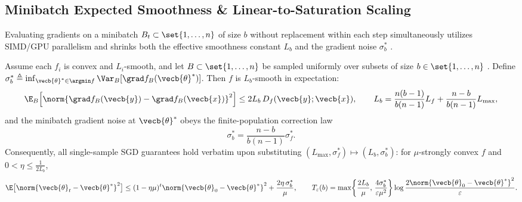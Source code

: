 \documentclass[../../../../master.tex]{subfiles}
\begin{document}
\subsection{Minibatch Expected Smoothness \& Linear-to-Saturation Scaling}
\label{sec:sgd:minibatch}

Evaluating gradients on a minibatch $B_t \subset \set{1,\dots,n}$ of size $b$ without replacement within each step simultaneously utilizes SIMD/GPU parallelism and shrinks both the effective smoothness constant $L_b$ and the gradient noise $\sigma_b^*$  .

\begin{coremath}
Assume each $f_i$ is convex and $L_i$-smooth, and let $B \subset \set{1,\dots,n}$ be sampled uniformly over subsets of size $b \in \set{1,\dots,n}$ . Define $\sigma_b^* \triangleq \inf_{\vecb{\theta}^*\in\argmin f} \Var_B[\grad f_B(\vecb{\theta}^*)]$. Then $f$ is $L_b$-smooth in expectation:
\begin{equation}
\label{eq:sgd:minibatch-Lb}
\E_B\Bigl[\norm{\grad f_B(\vecb{y}) - \grad f_B(\vecb{x})}^2\Bigr] \le 2L_b\, D_f(\vecb{y}; \vecb{x}),
\qquad
L_b = \frac{n(b-1)}{b(n-1)} L_f + \frac{n-b}{b(n-1)} L_{\max},
\end{equation}
and the minibatch gradient noise at $\vecb{\theta}^*$ obeys the finite-population correction law
\begin{equation}
\label{eq:sgd:minibatch-noise}
\sigma_b^* = \frac{n-b}{b(n-1)}\sigma_f^*.
\end{equation}
Consequently, all single-sample SGD guarantees hold verbatim upon substituting $(L_{\max}, \sigma_f^*) \mapsto (L_b, \sigma_b^*)$: for $\mu$-strongly convex $f$ and $0 < \eta \le \frac{1}{2L_b}$,
\begin{equation}
\label{eq:sgd:minibatch-sc}
\E\bigl[\norm{\vecb{\theta}_t - \vecb{\theta}^*}^2\bigr]
\le (1 - \eta\mu)^t\norm{\vecb{\theta}_0 - \vecb{\theta}^*}^2 + \frac{2\eta\,\sigma_b^*}{\mu},
\qquad
T_\varepsilon(b) = \max\!\left\{\frac{2L_b}{\mu},\, \frac{4\sigma_b^*}{\varepsilon\mu^2}\right\}\log\frac{2\norm{\vecb{\theta}_0 - \vecb{\theta}^*}^2}{\varepsilon}.
\end{equation}
\end{coremath}
\end{document}
